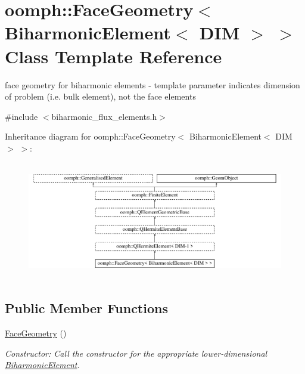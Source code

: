 \hypertarget{classoomph_1_1FaceGeometry_3_01BiharmonicElement_3_01DIM_01_4_01_4}{}\section{oomph\+:\+:Face\+Geometry$<$ Biharmonic\+Element$<$ D\+IM $>$ $>$ Class Template Reference}
\label{classoomph_1_1FaceGeometry_3_01BiharmonicElement_3_01DIM_01_4_01_4}


face geometry for biharmonic elements -\/ template parameter indicates dimension of problem (i.\+e. bulk element), not the face elements  




{\ttfamily \#include $<$biharmonic\+\_\+flux\+\_\+elements.\+h$>$}

Inheritance diagram for oomph\+:\+:Face\+Geometry$<$ Biharmonic\+Element$<$ D\+IM $>$ $>$\+:\begin{figure}[H]
\begin{center}
\leavevmode
\includegraphics[height=5.185185cm]{classoomph_1_1FaceGeometry_3_01BiharmonicElement_3_01DIM_01_4_01_4}
\end{center}
\end{figure}
\subsection*{Public Member Functions}
\begin{DoxyCompactItemize}
\item 
\hyperlink{classoomph_1_1FaceGeometry_3_01BiharmonicElement_3_01DIM_01_4_01_4_a77c1e59f2132ac5d9bcef25f025448fe}{Face\+Geometry} ()
\begin{DoxyCompactList}\small\item\em Constructor\+: Call the constructor for the appropriate lower-\/dimensional \hyperlink{classoomph_1_1BiharmonicElement}{Biharmonic\+Element}. \end{DoxyCompactList}\end{DoxyCompactItemize}
